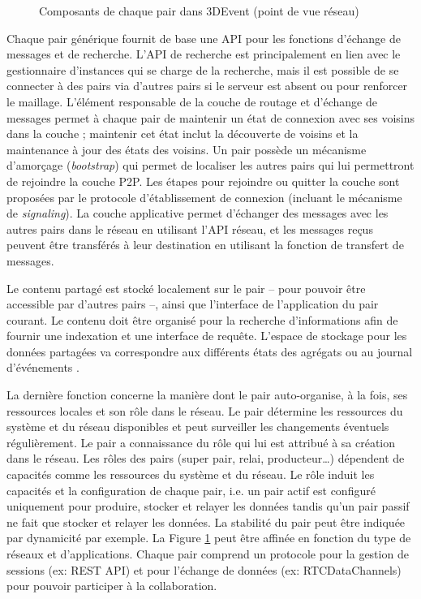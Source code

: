 \begin{figure}[ht]
	\centering
	\caption{Composants de chaque pair dans 3DEvent (point de vue réseau)}
	\label{fig:middleware}
\end{figure}


Chaque pair générique fournit de base une \gls{API} pour les fonctions d'échange 
de messages et de recherche. 
L'\gls{API} de recherche est principalement en lien avec le 
gestionnaire d'instances qui se charge de la recherche, mais il est possible de se 
connecter à des pairs via d'autres pairs si le serveur est absent ou pour renforcer 
le maillage.
L'élément responsable de la couche de routage et d'échange de messages permet 
à chaque pair de maintenir un état de connexion avec ses voisins dans la couche 
; maintenir cet état inclut la découverte de voisins et la maintenance  à jour des 
états des voisins.
Un pair possède un mécanisme d'amorçage (\textit{bootstrap}) qui permet de 
localiser les autres pairs qui lui permettront de rejoindre la couche \gls{P2P}. Les 
étapes pour rejoindre ou quitter la couche sont proposées par le protocole 
d'établissement de connexion (incluant le mécanisme de \textit{signaling}).
La couche applicative permet d'échanger des messages avec les autres pairs 
dans le réseau en utilisant l'\gls{API} réseau, et les messages reçus peuvent être 
transférés à leur destination en utilisant la fonction de transfert de messages. 

Le contenu partagé est stocké localement sur le pair -- pour pouvoir être 
accessible par d'autres pairs --, ainsi que l'interface de l'application du pair courant. 
Le contenu doit être organisé pour la recherche d'informations afin de fournir une 
indexation et une interface de requête. 
L'espace de stockage pour les données partagées va correspondre aux différents 
états des agrégats \cite{Desprat2015a,Desprat2015b} ou au journal d'événements 
\cite{Desprat2016,Desprat2017}.


La dernière fonction concerne la manière dont le pair auto-organise, à la fois, ses 
ressources locales et son rôle dans le réseau. Le pair détermine les 
ressources du système et du réseau disponibles et peut surveiller les 
changements éventuels régulièrement.
Le pair a connaissance du rôle qui lui est attribué à sa création dans le réseau. 
Les rôles des pairs (super pair, relai, producteur\dots) dépendent de 
capacités comme les ressources du système et du réseau. Le rôle induit les 
capacités et la configuration de chaque pair, i.e. un pair actif est configuré 
uniquement pour produire, stocker et relayer les données tandis qu'un pair passif 
ne fait que stocker et relayer les données. La stabilité du pair peut être indiquée 
par dynamicité par exemple. 
La Figure \ref{fig:middleware} peut être affinée en fonction du type de 
réseaux et d'applications. Chaque pair comprend un protocole pour la gestion
de sessions (ex: REST API) et pour l'échange de données (ex: RTCDataChannels)  
pour pouvoir participer à la collaboration.



